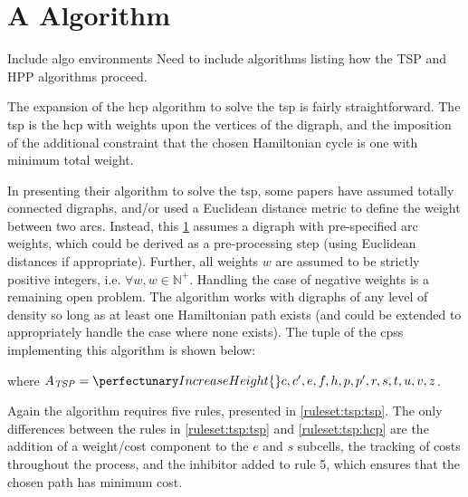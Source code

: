 \section{A   Algorithm}\label{sec:tsp:algotsp}

\begin{anfxerror}{Include algo environments}
Need to include algorithms listing how the TSP and HPP algorithms proceed.
\end{anfxerror}

The expansion of the \gls{hcp} algorithm to solve the \gls{tsp} is fairly straightforward.  The \gls{tsp} is the \gls{hcp} with weights upon the vertices of the digraph, and the imposition of the additional constraint that the chosen Hamiltonian cycle is one with minimum total weight.  

In presenting their algorithm to solve the \gls{tsp}, some papers have assumed totally connected digraphs, and/or used a Euclidean distance metric to define the weight between two arcs.  Instead, this \cref{sec:tsp:algotsp} assumes a digraph with pre-specified arc weights, which could be derived as a pre-processing step (using Euclidean distances if appropriate).   Further, all weights \(w\) are assumed to be strictly positive integers, i.e. \(\forall w, w \in \mathbb{N}^+\).  Handling the case of negative weights is a remaining open problem.  The algorithm works with digraphs of any level of density so long as at least one Hamiltonian path exists (and could be extended to appropriately handle the case where none exists).  The tuple of the \glspl{cps} implementing this algorithm is shown below:

\noindent
where \(A_{\mathit{TSP}} = \cpset{c, c', e, f, h, p, p', r, s, t, u, v, z}\).

Again the algorithm requires five rules, presented in \cref{ruleset:tsp:tsp}.  The only differences between the rules in \cref{ruleset:tsp:tsp} and \cref{ruleset:tsp:hcp} are the addition of a weight/cost component to the \(e\) and \(s\) subcells, the tracking of costs throughout the process, and the inhibitor added to rule 5, which ensures that the chosen path has minimum cost.

